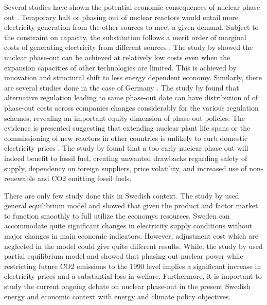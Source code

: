 \documentclass[10pt,a4paper]{article}
\begin{document}
Several studies have shown the potential economic consequences of nuclear phase-out \citep{Bohringer2002, Nestle2012, Bretschger2012, Duscha0, Glomsrod2013, Kunsch2014}. Temporary halt or phasing out of nuclear reactors would entail more electricity generation from the other sources to meet a given demand. Subject to the constraint on capacity, the substitution follows a merit order of marginal costs of generating electricity from different sources \citep{Glomsrod2013}. The study by \cite{Bretschger2012} showed the nuclear phase-out can be achieved at relatively low costs even when the expansion capacities of other technologies are limited. This is achieved by innovation and structural shift to less energy dependent economy. Similarly, there are several studies done in the case of Germany \citep{Bohringer2002, Nestle2012}. The study by \cite{Bohringer2002} found that alternative regulation leading to same phase-out date can have distribution of of phase-out costs across companies changes considerably for the various regulation schemes, revealing an important equity dimension of phase-out policies. The evidence is presented suggesting that extending nuclear plant life spans or the commissioning of new reactors in other countries is unlikely to curb domestic electricity prices \citep{Nestle2012}. The study by \cite{Kunsch2014} found that a too early nuclear phase out will indeed benefit to fossil fuel, creating unwanted drawbacks regarding safety of supply, dependency on foreign suppliers, price volatility, and increased use of non-renewable and CO2 emitting fossil fuels.

There are only few study done this in Swedish context. The study by \citep{Bergman1981} used general equilibrium model and showed that given the product and factor market to function smoothly to full utilize the economys resources, Sweden can accommodate quite significant changes in electricity supply conditions without major changes in main economic indicators. However, adjustment cost which are neglected in the model could give quite different results. While, the study by \cite{ Andersson1997} used partial equilibrium model and showed that phasing out nuclear power while restricting future CO2 emissions to the 1990 level implies a significant increase in electricity prices and a substantial loss in welfare. Furthermore, it is important to study the current ongoing debate on nuclear phase-out in the present Swedish energy and economic context with energy and climate policy objectives.
\end{document}
